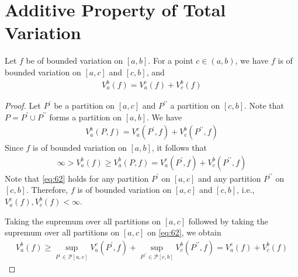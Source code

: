\documentclass[thmcnt=section, 12pt]{elegantbook}
\begin{document}
\section{Additive Property of Total Variation}


\begin{theorem} \label{thm:32}
    Let $f$ be of bounded variation on $[a, b]$. For a point $c \in (a, b)$, we have $f$ is of bounded variation on $[a, c]$ and $[c, b]$, and 
    \begin{align}
        V_a^b(f) = V_a^c(f) + V_c^b(f)
        \label{eq:61}
    \end{align}
\end{theorem}

\begin{proof}
    Let $P^\prime$ be a partition on $[a, c]$ and $P^{\prime\prime}$ a partition on $[c, b]$. Note that $P = P^\prime \cup P^{\prime\prime}$ forms a partition on $[a, b]$. We have
    \begin{align*}
        V_a^b(P, f) = V_a^c(P^\prime, f) + V_c^b(P^{\prime\prime}, f)
    \end{align*}
    Since $f$ is of bounded variation on $[a, b]$, it follows that 
    \begin{align}
        \infty > V_a^b(f) 
        \geq V_a^b(P, f) 
        = V_a^c(P^\prime, f) + V_c^b(P^{\prime\prime}, f)
        \label{eq:62}
    \end{align}
    Note that \eqref{eq:62} holds for any partition $P^\prime$ on $[a, c]$ and any partition $P^{\prime\prime}$ on $[c, b]$. Therefore, $f$ is of bounded variation on $[a, c]$ and $[c, b]$, i.e., $V_a^c(f), V_c^b(f) < \infty$.

    \par Taking the supremum over all partitions on $[a, c]$ followed by taking the supremum over all partitions on $[a, c]$ on \eqref{eq:62}, we obtain
    \begin{align}
        V_a^b(f) 
        \geq \sup_{P^\prime \in \mathcal{P}[a, c]} V_a^c(P^\prime, f) 
        + \sup_{P^{\prime\prime} \in \mathcal{P}[c, b]} V_c^b(P^{\prime\prime}, f)
        = V_a^c(f) + V_c^b(f)
        \label{eq:63}
    \end{align}


\end{proof}
\end{document}
